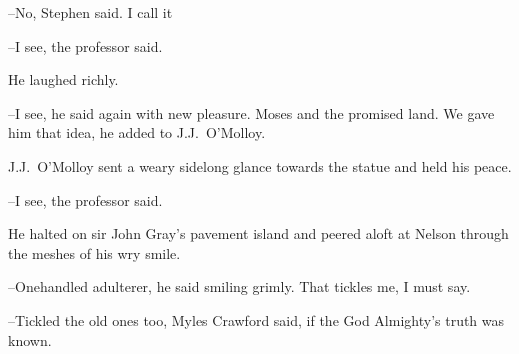 --No,
Stephen said.
I call it

--I see,
the professor said.

He laughed richly.

--I see,
he said again with new pleasure.
Moses and the promised land.
We gave him that idea,
he added to J.J.~O'Molloy.



J.J.~O'Molloy sent a weary sidelong glance towards the statue
and held his peace.

--I see,
the professor said.

He halted on sir John Gray's pavement island
and peered aloft at Nelson through the meshes of his wry smile.



--Onehandled adulterer,
he said smiling grimly.
That tickles me, I must say.

--Tickled the old ones too,
Myles Crawford said,
if the God Almighty's truth was known.


